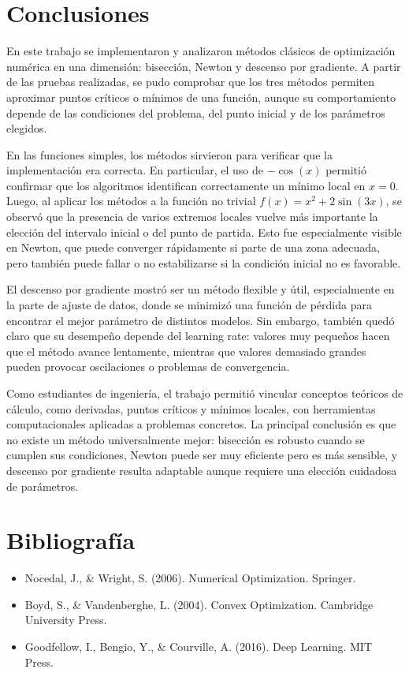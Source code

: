 \documentclass[12pt,a4paper]{article}
\begin{document}
\section{Conclusiones}

En este trabajo se implementaron y analizaron métodos clásicos de optimización numérica en una dimensión: bisección, Newton y descenso por gradiente. A partir de las pruebas realizadas, se pudo comprobar que los tres métodos permiten aproximar puntos críticos o mínimos de una función, aunque su comportamiento depende de las condiciones del problema, del punto inicial y de los parámetros elegidos.

En las funciones simples, los métodos sirvieron para verificar que la implementación era correcta. En particular, el uso de $-\cos(x)$ permitió confirmar que los algoritmos identifican correctamente un mínimo local en $x=0$. Luego, al aplicar los métodos a la función no trivial $f(x)=x^2+2\sin(3x)$, se observó que la presencia de varios extremos locales vuelve más importante la elección del intervalo inicial o del punto de partida. Esto fue especialmente visible en Newton, que puede converger rápidamente si parte de una zona adecuada, pero también puede fallar o no estabilizarse si la condición inicial no es favorable.

El descenso por gradiente mostró ser un método flexible y útil, especialmente en la parte de ajuste de datos, donde se minimizó una función de pérdida para encontrar el mejor parámetro de distintos modelos. Sin embargo, también quedó claro que su desempeño depende del learning rate: valores muy pequeños hacen que el método avance lentamente, mientras que valores demasiado grandes pueden provocar oscilaciones o problemas de convergencia.

Como estudiantes de ingeniería, el trabajo permitió vincular conceptos teóricos de cálculo, como derivadas, puntos críticos y mínimos locales, con herramientas computacionales aplicadas a problemas concretos. La principal conclusión es que no existe un método universalmente mejor: bisección es robusto cuando se cumplen sus condiciones, Newton puede ser muy eficiente pero es más sensible, y descenso por gradiente resulta adaptable aunque requiere una elección cuidadosa de parámetros.

\section*{Bibliografía}
\begin{itemize}
    \item Nocedal, J., \& Wright, S. (2006). Numerical Optimization. Springer.
    \item Boyd, S., \& Vandenberghe, L. (2004). Convex Optimization. Cambridge University Press.
    \item Goodfellow, I., Bengio, Y., \& Courville, A. (2016). Deep Learning. MIT Press.
\end{itemize}
\end{document}
